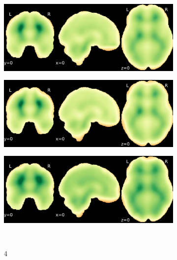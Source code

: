 \documentclass{article}
\begin{document}
\begin{appendices}
\begin{landscape}
\begin{figure}
\begin{subfigure}[t]{0.2\paperheight}
            \end{subfigure}
            \begin{subfigure}[t]{0.2\paperheight}
                \centering
                \includegraphics[width=\textwidth]{figures/sig/20mm/rr_ds000256_sub-CTS201_sig.pdf}
            \end{subfigure}
            \begin{subfigure}[t]{0.2\paperheight}
                \centering
                \includegraphics[width=\textwidth]{figures/sig/20mm/rs_ds000256_sub-CTS201_sig.pdf}
            \end{subfigure}
            \begin{subfigure}[t]{0.2\paperheight}
                \centering
                \includegraphics[width=\textwidth]{figures/sig/20mm/rr.rs_ds000256_sub-CTS201_sig.pdf}
            \end{subfigure} \\
            \begin{subfigure}[b][][c]{0.01\paperwidth} 4 \vspace*{15pt} \end{subfigure}

\end{figure}
\end{landscape}
\end{appendices}
\end{document}
